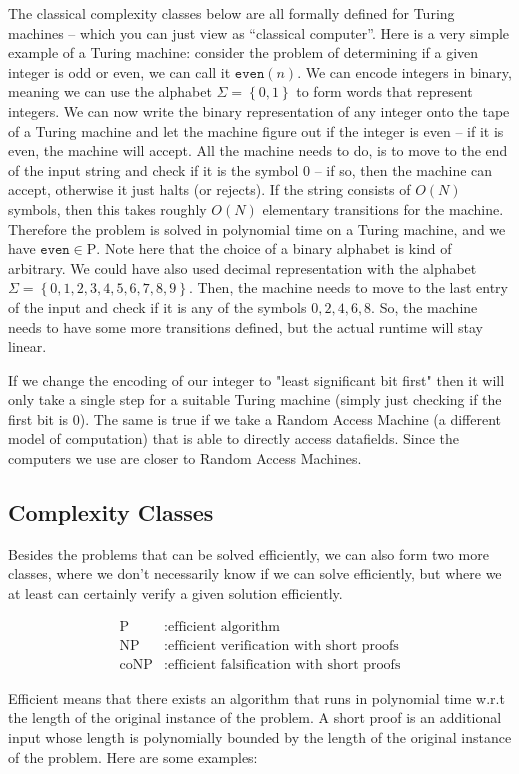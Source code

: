 The classical complexity classes below are all formally defined for Turing machines -- which you can just view as ``classical computer''.
Here is a very simple example of a Turing machine: consider the problem of determining if a given integer is odd or even, we can call it $\texttt{even}(n)$. We can encode integers in binary, meaning we can use the alphabet $\Sigma=\left\{0,1\right\}$ to form words that represent integers. We can now write the binary representation of any integer onto the tape of a Turing machine and let the machine figure out if the integer is even -- if it is even, the machine will accept. All the machine needs to do, is to move to the end of the input string and check if it is the symbol 0 -- if so, then the machine can accept, otherwise it just halts (or rejects). If the string consists of $O(N)$ symbols, then this takes roughly $O(N)$ elementary transitions for the machine. Therefore the problem is solved in polynomial time on a Turing machine, and we have $\texttt{even}\in \mathrm{P}$. Note here that the choice of a binary alphabet is kind of arbitrary. We could have also used decimal representation with the alphabet $\Sigma=\left\{0,1,2,3,4,5,6,7,8,9\right\}$. Then, the machine needs to move to the last entry of the input and check if it is any of the symbols $0,2,4,6,8$. So, the machine needs to have some more transitions defined, but the actual runtime will stay linear.

If we change the encoding of our integer to "least significant bit first" then it will only take a single step for a suitable Turing machine (simply just checking if the first bit is 0). The same is true if we take a Random Access Machine (a different model of computation) that is able to directly access datafields. Since the computers we use are closer to Random Access Machines.

\subsection{Complexity Classes}

Besides the problems that can be solved efficiently, we can also form two more classes, where we don't necessarily know if we can solve efficiently, but where we at least can certainly verify a given solution efficiently.

\begin{def*}\phantom{...}
\begin{align*}
\mathrm{P} &: \text{efficient algorithm}\\
\mathrm{NP}&: \text{efficient verification with short proofs}\\
\mathrm{coNP} &: \text{efficient falsification with short proofs}     
\end{align*}
\end{def*}
Efficient means that there exists an algorithm that runs in polynomial time w.r.t the length of the original instance of the problem. A short proof is an additional input whose length is polynomially bounded by the length of the original instance of the problem.
Here are some examples:

